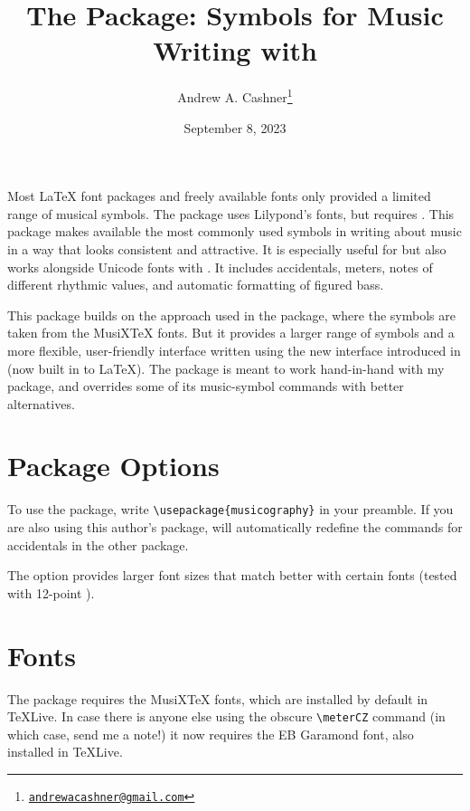 \documentclass{article}
\title{The \code{musicography} Package: Symbols for Music Writing with
\code{pdflatex}}
\author{Andrew A. Cashner\thanks{%
    \href{mailto:andrewacashner@gmail.com}
    {\nolinkurl{andrewacashner@gmail.com}}%
    }%
}
\date{September 8, 2023}
\begin{document}
\maketitle

Most \LaTeX{} font packages and freely available fonts only provided a limited
range of musical symbols. 
The  package uses Lilypond's fonts, but requires
. 
This package makes available the most commonly used symbols in writing about
music in a way that looks consistent and attractive.
It is especially useful for  but also works alongside Unicode
fonts with .
It includes accidentals, meters, notes of different rhythmic values, and
automatic formatting of figured bass.

This package builds on the approach used in the  package, where
the symbols are taken from the MusiXTeX fonts.
But it provides a larger range of symbols and a more flexible, user-friendly
interface written using the new interface introduced in   (now
built in to \LaTeX).
The package is meant to work hand-in-hand with my 
package, and overrides some of its music-symbol commands with better
alternatives.

\tableofcontents

\section{Package Options}

To use the package, write \verb|\usepackage{musicography}| in your preamble.
If you are also using this author's  package, 
 will automatically redefine the commands for accidentals in
the other package.

The  option provides larger font sizes that match better with
certain fonts (tested with 12-point ).

\section{Fonts}

The package requires the MusiX\TeX{} fonts, which are installed by default in
\TeX{}Live.
In case there is anyone else using the obscure \verb|\meterCZ| command (in
which case, send me a note!) it now requires the EB Garamond font, also
installed in \TeX{}Live.
\end{document}
